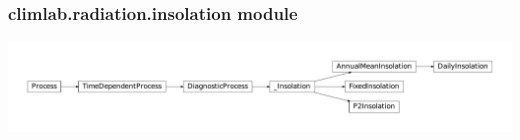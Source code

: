 \documentclass[a4paper,10pt,english]{sphinxmanual}
\begin{document}
\subsubsection{climlab.radiation.insolation module}
\label{api/climlab.radiation:climlab-radiation-insolation-module}
\includegraphics{inheritance-2fabe0d6f5c260b023f1582e871aa6d6b64a2ba8.pdf}
\label{api/climlab.radiation:module-climlab.radiation.insolation}
\end{document}

